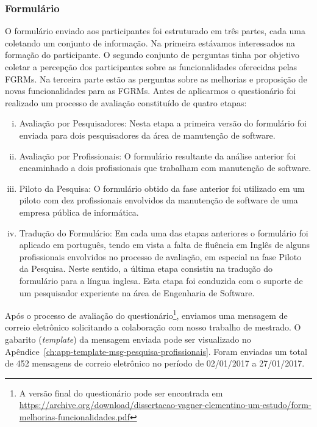 \subsubsection{Formulário}\label{subsubsec:questionario}

O formulário enviado aos participantes foi estruturado em três partes, cada uma
coletando um conjunto de informação. Na primeira estávamos interessados na
formação do participante. O segundo conjunto de perguntas tinha por objetivo
coletar a percepção dos participantes sobre as funcionalidades oferecidas pelas
FGRMs\@. Na terceira parte estão as perguntas sobre as melhorias e proposição de
novas funcionalidades para as FGRMs. Antes de aplicarmos o questionário foi
realizado um processo de avaliação constituído de quatro etapas:

\begin{enumerate}[(i)]
	\item Avaliação por Pesquisadores: Nesta etapa a primeira versão do
		formulário foi enviada para dois pesquisadores da área de manutenção de
		software.
	\item Avaliação por Profissionais: O formulário resultante da análise
		anterior foi encaminhado a dois profissionais que trabalham com
		manutenção de software.
	\item Piloto da Pesquisa: O formulário obtido da fase anterior foi utilizado
		em um piloto com dez profissionais envolvidos da manutenção de software
		de uma empresa pública de informática.
	\item Tradução do Formulário: Em cada uma das etapas anteriores o
		formulário foi aplicado em português, tendo em vista a falta de fluência
		em Inglês de alguns profissionais envolvidos no processo de avaliação,
		em especial na fase Piloto da Pesquisa. Neste sentido, a última etapa
		consistiu na tradução do formulário para a língua inglesa. Esta etapa
		foi conduzida com o suporte de um pesquisador experiente na área de
		Engenharia de Software.
\end{enumerate}

Após o processo de avaliação do questionário\footnote{A versão final do
    questionário pode ser encontrada em
    \url{https://archive.org/download/dissertacao-vagner-clementino-um-estudo/form-melhorias-funcionalidades.pdf}},
enviamos uma mensagem de correio eletrônico solicitando a colaboração com nosso
trabalho de mestrado. O gabarito (\textit{template}) da mensagem enviada pode
ser visualizado no Apêndice~\ref{ch:app-template-msg-pesquisa-profissionais}.
Foram enviadas um total de 452 mensagens de correio eletrônico no período de
02/01/2017 a 27/01/2017.

